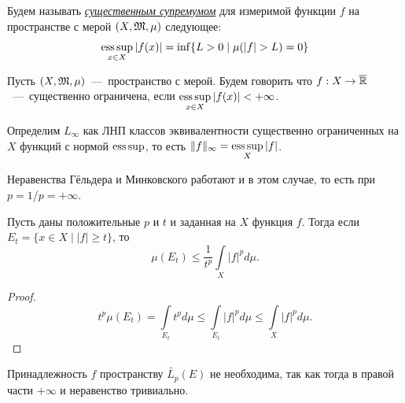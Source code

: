 \begin{definition}
    Будем называть \textit{\underline{существенным супремумом}} для измеримой функции $f$ на пространстве с мерой $(X, \mathfrak{M}, \mu)$ следующее: \[\operatorname*{ess\,sup}\limits_{x \in X}|f(x)| = \inf\{L > 0 \mid \mu(|f| > L) = 0\}\]
\end{definition}
\begin{definition}
    Пусть $(X, \mathfrak{M}, \mu)$~---~пространство с мерой. Будем говорить что $f: X \rightarrow \overline{\mathbb{R}}$~---~существенно ограничена, если $\operatorname*{ess\,sup}\limits_{x \in X} |f(x)| < +\infty$.
\end{definition}
\begin{definition}
    Определим $L_\infty$ как ЛНП классов эквивалентности существенно ограниченных на $X$ функций с нормой $\operatorname*{ess\,sup}$, то есть $\|f\|_\infty = \operatorname*{ess\,sup}\limits_X |f|$.
\end{definition}
\begin{note}
    Неравенства Гёльдера и Минковского работают и в этом случае, то есть при $p = 1$/$p = +\infty$.
\end{note}

\begin{theorem}
    Пусть даны положительные $p$ и $t$ и заданная на $X$ функция $f$. Тогда если $E_t = \{x \in X \mid |f| \geq t\}$, то \[\mu(E_t) \leq \frac{1}{t^p}\int\limits_X |f|^pd\mu.\]
\end{theorem}
\begin{proof}
    \[t^p\mu(E_t) = \int\limits_{E_t} t^pd\mu \leq \int\limits_{E_t} |f|^pd\mu \leq \int\limits_{X}|f|^pd\mu.\]
\end{proof}

\begin{remark}
    Принадлежность $f$ пространству $\widetilde{L_p} (E)$ не необходима, так как тогда в правой части $+\infty$ и неравенство тривиально.
\end{remark}
